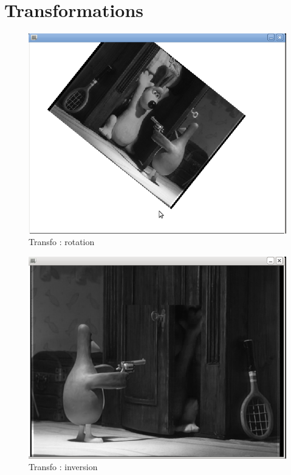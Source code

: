 \documentclass{beamer}
\begin{document}
\section{Transformations}
\begin{frame}
\begin{figure}[!h]
\centering
\includegraphics[scale = 0.3]{Rotation.png}
\caption{Transfo : rotation}
\end{figure}
\end{frame}

\begin{frame}
\begin{figure}[!h]
\centering
\includegraphics[scale = 0.3]{Inversion.png}
\caption{Transfo : inversion}
\end{figure}
\end{frame}
\end{document}

